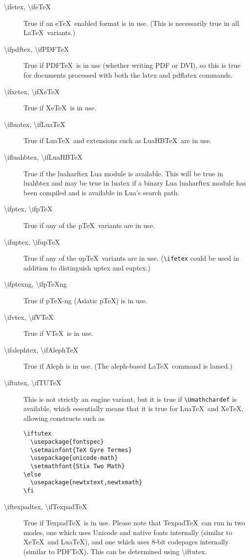 \documentclass{article}
\newcommand\cs[1]{{\ttfamily\textbackslash #1}}
\begin{document}
\begin{description}
\item[\cs{ifetex},      \cs{ifeTeX}]
True if an e\TeX\ enabled format is in use. (This is necessarily true
in all \LaTeX\ variants.)
\item[\cs{ifpdftex},    \cs{ifPDFTeX}]
True if PDF\TeX\ is in use (whether writing PDF or DVI), so this is
true for documents processed with both the  \textsf{latex} and
\textsf{pdflatex} commands.
\item[\cs{ifxetex},     \cs{ifXeTeX}]
True if Xe\TeX\ is in use.
\item[\cs{ifluatex},    \cs{ifLuaTeX}]
True if Lua\TeX\ and extensions such as LuaHB\TeX\ are in use.
\item[\cs{ifluahbtex},  \cs{ifLuaHBTeX}]
True if the \textsf{luaharftex} Lua module is available.
This will be true in \textsf{luahbtex} and may be true in
\textsf{luatex} if a binary Lua \textsf{luaharftex} module has been
compiled and is available in Lua's search path.
\item[\cs{ifptex},      \cs{ifpTeX}]
True if any of the p\TeX\ variants are in use.
\item[\cs{ifuptex},     \cs{ifupTeX}]
True if any of the up\TeX\ variants are in use. (\verb|\ifetex| could
be used in addition to distinguish \textsf{uptex} and \textsf{euptex}.)
\item[\cs{ifptexng},    \cs{ifpTeXng}]
True if p\TeX-ng (Asiatic p\TeX) is in use.
\item[\cs{ifvtex},      \cs{ifVTeX}]
True if V\TeX\ is in use.
\item[\cs{ifalephtex},  \cs{ifAlephTeX}]
True if Aleph is in use. (The \textsf{aleph}-based \LaTeX\ command is
\textsf{lamed}.)
\item[\cs{iftutex},     \cs{ifTUTeX}]
This is not strictly an engine variant, but it is true if
\verb|\Umathchardef| is available, which essentially means that it is
true for Lua\TeX\ and Xe\TeX, allowing constructs such as
\begin{verbatim}
\iftutex
  \usepackage{fontspec}
  \setmainfont{TeX Gyre Termes}
  \usepackage{unicode-math}
  \setmathfont{Stix Two Math}
\else
  \usepackage{newtxtext,newtxmath}
\fi
\end{verbatim}
\item[\cs{iftexpadtex}, \cs{ifTexpadTeX}]
True if Texpad\TeX\ is in use. Please note that Texpad\TeX\ can run in two
modes, one which uses Unicode and native fonts internally (similar to
Xe\TeX\ and Lua\TeX), and one which uses 8-bit codepages internally (similar to
PDF\TeX). This can be determined using \cs{iftutex}.

\end{description}
\end{document}
